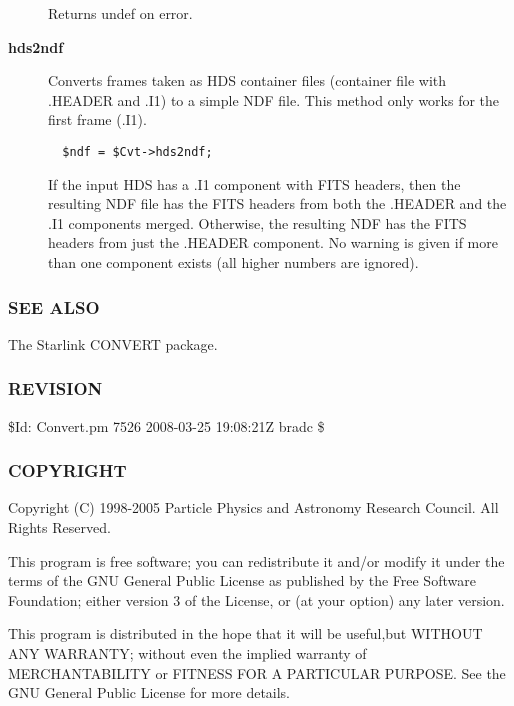 \begin{description}
Returns undef on error.


\item[{\textbf{hds2ndf}}] \mbox{}

Converts frames taken as HDS container files (container file with
.HEADER and .I1) to a simple NDF file. This method only works
for the first frame (.I1).

\begin{verbatim}
  $ndf = $Cvt->hds2ndf;
\end{verbatim}


If the input HDS has a .I1 component with FITS headers, then the
resulting NDF file has the FITS headers from both the .HEADER and
the .I1 components merged. Otherwise, the resulting NDF has the
FITS headers from just the .HEADER component. No warning is given
if more than one component exists (all higher numbers are ignored).

\end{description}
\subsubsection*{SEE ALSO\label{ORAC::Convert_SEE_ALSO}}


The Starlink CONVERT package.

\subsubsection*{REVISION\label{ORAC::Convert_REVISION}}


\$Id: Convert.pm 7526 2008-03-25 19:08:21Z bradc \$

\subsubsection*{COPYRIGHT\label{ORAC::Convert_COPYRIGHT}}


Copyright (C) 1998-2005 Particle Physics and Astronomy Research
Council. All Rights Reserved.



This program is free software; you can redistribute it and/or modify it under
the terms of the GNU General Public License as published by the Free Software
Foundation; either version 3 of the License, or (at your option) any later
version.



This program is distributed in the hope that it will be useful,but WITHOUT ANY
WARRANTY; without even the implied warranty of MERCHANTABILITY or FITNESS FOR A
PARTICULAR PURPOSE. See the GNU General Public License for more details.




